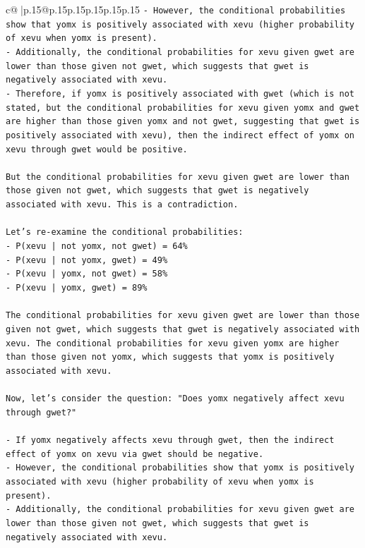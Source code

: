 \documentclass{article}
\begin{document}
{\begin{supertabular}{c@{$\;$}|p{.15\linewidth}@{}p{.15\linewidth}p{.15\linewidth}p{.15\linewidth}p{.15\linewidth}p{.15\linewidth}}
{{{\texttt{{-}   However, the conditional probabilities show that yomx is positively associated with xevu (higher probability of xevu when yomx is present).} \\
\texttt{{-}   Additionally, the conditional probabilities for xevu given gwet are lower than those given not gwet, which suggests that gwet is negatively associated with xevu.} \\
\texttt{{-}   Therefore, if yomx is positively associated with gwet (which is not stated, but the conditional probabilities for xevu given yomx and gwet are higher than those given yomx and not gwet, suggesting that gwet is positively associated with xevu), then the indirect effect of yomx on xevu through gwet would be positive.} \\
\\ 
\texttt{But the conditional probabilities for xevu given gwet are lower than those given not gwet, which suggests that gwet is negatively associated with xevu. This is a contradiction.} \\
\\ 
\texttt{Let's re{-}examine the conditional probabilities:} \\
\texttt{{-}   P(xevu | not yomx, not gwet) = 64\%} \\
\texttt{{-}   P(xevu | not yomx, gwet) = 49\%} \\
\texttt{{-}   P(xevu | yomx, not gwet) = 58\%} \\
\texttt{{-}   P(xevu | yomx, gwet) = 89\%} \\
\\ 
\texttt{The conditional probabilities for xevu given gwet are lower than those given not gwet, which suggests that gwet is negatively associated with xevu. The conditional probabilities for xevu given yomx are higher than those given not yomx, which suggests that yomx is positively associated with xevu.} \\
\\ 
\texttt{Now, let's consider the question: "Does yomx negatively affect xevu through gwet?"} \\
\\ 
\texttt{{-}   If yomx negatively affects xevu through gwet, then the indirect effect of yomx on xevu via gwet should be negative.} \\
\texttt{{-}   However, the conditional probabilities show that yomx is positively associated with xevu (higher probability of xevu when yomx is present).} \\
\texttt{{-}   Additionally, the conditional probabilities for xevu given gwet are lower than those given not gwet, which suggests that gwet is negatively associated with xevu.} \\
}}}
\end{supertabular}}
\end{document}
